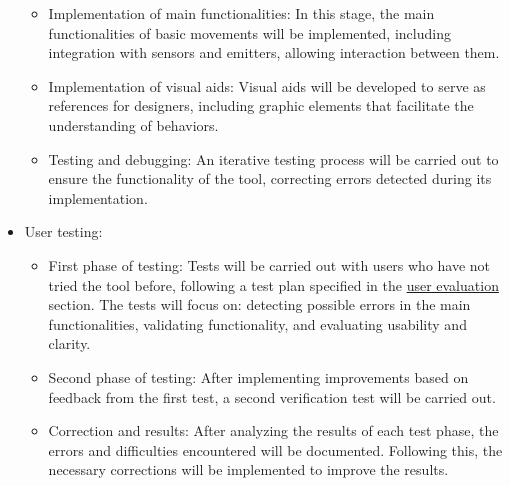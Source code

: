 \begin{itemize}
\begin{itemize}
	    \item  Implementation of main functionalities: In this stage, the main functionalities of basic movements will be implemented, including integration with sensors and emitters, allowing interaction between them.
	    \item Implementation of visual aids: Visual aids will be developed to serve as references for designers, including graphic elements that facilitate the understanding of behaviors.
	    \item Testing and debugging: An iterative testing process will be carried out to ensure the functionality of the tool, correcting errors detected during its implementation.
	\end{itemize}
    \item User testing:
	\begin{itemize}
	    \item First phase of testing: Tests will be carried out with users who have not tried the tool before, following a test plan specified in the \hyperref[cap:evaluacionConUsuarios]{user evaluation} section. The tests will focus on: detecting possible errors in the main functionalities, validating functionality, and evaluating usability and clarity.
	    \item Second phase of testing: After implementing improvements based on feedback from the first test, a second verification test will be carried out.
	    \item Correction and results: After analyzing the results of each test phase, the errors and difficulties encountered will be documented. Following this, the necessary corrections will be implemented to improve the results.
	\end{itemize}

\end{itemize}
